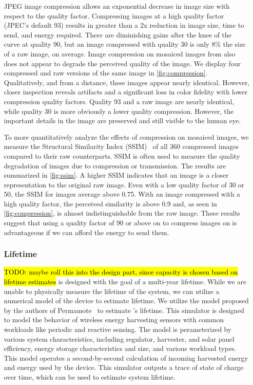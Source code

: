 
JPEG image compression allows an exponential decrease in image size with respect to the quality factor.
Compressing images at a high quality factor (JPEC's default 93) results in greater than a 2x reduction in image size, time to send, and energy required. There are diminishing gains after the knee of the curve at quality 90, but an image compressed with quality 30 is only 8\% the size of a raw image, on average. Image compression on mosaiced images from \name also does not appear to degrade the perceived quality of the image. We display four compressed and raw versions of the same image in \cref{fig:compression}. Qualitatively, and from a distance, these images appear nearly identical. However, closer inspection reveals artifacts and a significant loss in color fidelity with lower compression quality factors. Quality 93 and a raw image are nearly identical, while quality 30 is more obviously a lower quality compression. However, the important details in the image are preserved and still visible to the human eye.


To more quantitatively analyze the effects of compression on mosaiced images, we measure the Structural Similarity Index (SSIM)~\cite{wang2004image} of all 360 compressed images compared to their raw counterparts. SSIM is often used to measure the quality degradation of images due to compression or transmission. The results are summarized in \cref{fig:ssim}. A higher SSIM indicates that an image is a closer representation to the original raw image.
Even with a low quality factor of 30 or 50, the SSIM for images average above 0.75. With an image compressed with a high quality factor, the perceived similarity is above 0.9 and, as seen in \cref{fig:compression}, is almost indistinguishable from the raw image. These results suggest that using a quality factor of 90 or above on to compress images on \name is advantageous if we can afford the energy to send them.

\subsubsection{Lifetime}
\hl{TODO: maybe roll this into the design part, since capacity is chosen based on lifetime estimates}
\name is designed with the goal of a multi-year lifetime. While we are unable to physically measure the lifetime of the system, we can utilize a numerical model of the device to estimate lifetime. We utilize the model proposed by the authors of Permamote~\cite{jackson2019capacity} to estimate \name's lifetime. 
This simulator is designed to model the behavior of wireless energy harvesting sensors with common workloads like periodic and reactive sensing. The model is perameterized by various system characteristics, including regulator, harvester, and solar panel efficiency, energy storage characteristics and size, and various workload types.
This model operates a second-by-second calculation of incoming harvested energy and energy used by the device.
This simulator outputs a trace of state of charge over time, which can be used to estimate system lifetime.

